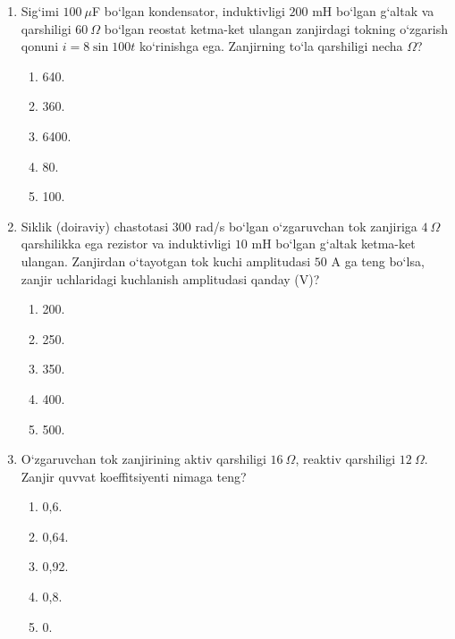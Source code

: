 \begin{enumerate}

\begin{enumerate}[label=\Alph*)]
\item 4.
\item 8.
\item 12.
\item 16.
\item 6.
\end{enumerate}

\item Sig‘imi $100~\mu$F bo‘lgan kondensator, induktivligi $200$ mH bo‘lgan g‘altak va qarshiligi $60~\Omega$ bo‘lgan reostat ketma-ket ulangan zanjirdagi tokning o‘zgarish qonuni $i=8\sin100t$ ko‘rinishga ega. Zanjirning to‘la qarshiligi necha $\Omega$?
\begin{enumerate}[label=\Alph*)]
\item 640.
\item 360.
\item 6400.
\item 80.
\item 100.
\end{enumerate}

\item Siklik (doiraviy) chastotasi $300$ rad/s bo‘lgan o‘zgaruvchan tok zanjiriga $4~\Omega$ qarshilikka ega rezistor va induktivligi $10$ mH bo‘lgan g‘altak ketma-ket ulangan. Zanjirdan o‘tayotgan tok kuchi amplitudasi $50$ A ga teng bo‘lsa, zanjir uchlaridagi kuchlanish amplitudasi qanday (V)?
\begin{enumerate}[label=\Alph*)]
\item 200.
\item 250.
\item 350.
\item 400.
\item 500.
\end{enumerate}

\item O‘zgaruvchan tok zanjirining aktiv qarshiligi $16~\Omega$, reaktiv qarshiligi $12~\Omega$. Zanjir quvvat koeffitsiyenti nimaga teng?
\begin{enumerate}[label=\Alph*)]
\item 0,6.
\item 0,64.
\item 0,92.
\item 0,8.
\item 0.
\end{enumerate}


\end{enumerate}

